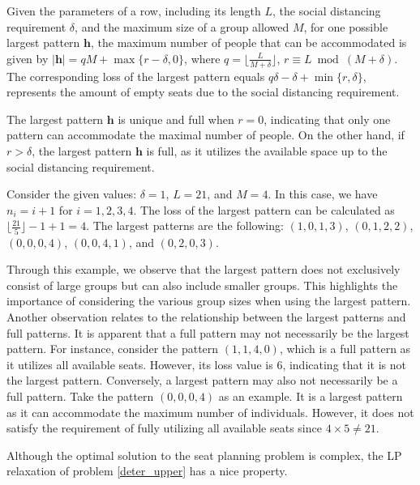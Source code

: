 \begin{prop}\label{lem_pattern}
Given the parameters of a row, including its length $L$, the social distancing requirement $\delta$, and the maximum size of a group allowed $M$, for one possible largest pattern $\bm{h}$, the maximum number of people that can be accommodated is given by $|\bm{h}| = qM + \max\{r-\delta, 0\}$, where $q = \lfloor \frac{L}{M + \delta} \rfloor$, $r \equiv L \bmod (M + \delta)$. The corresponding loss of the largest pattern equals $q \delta - \delta + \min\{r, \delta\}$, represents the amount of empty seats due to the social distancing requirement. 
\end{prop}

The largest pattern $\bm{h}$ is unique and full when $r = 0$, indicating that only one pattern can accommodate the maximal number of people. On the other hand, if $r > \delta$, the largest pattern $\bm{h}$ is full, as it utilizes the available space up to the social distancing requirement.


\begin{example}
Consider the given values: $\delta = 1$, $L = 21$, and $M = 4$. In this case, we have $n_i = i + 1$ for $i = 1, 2, 3, 4$. The loss of the largest pattern can be calculated as $\lfloor \frac{21}{5} \rfloor - 1 + 1 = 4$. The largest patterns are the following: $(1, 0, 1, 3)$, $(0, 1, 2, 2)$, $(0, 0, 0, 4)$, $(0, 0, 4, 1)$, and $(0, 2, 0, 3)$. 
\end{example}
  

Through this example, we observe that the largest pattern does not exclusively consist of large groups but can also include smaller groups. This highlights the importance of considering the various group sizes when using the largest pattern. Another observation relates to the relationship between the largest patterns and full patterns. It is apparent that a full pattern may not necessarily be the largest pattern. For instance, consider the pattern $(1, 1, 4, 0)$, which is a full pattern as it utilizes all available seats. However, its loss value is 6, indicating that it is not the largest pattern. Conversely, a largest pattern may also not necessarily be a full pattern. Take the pattern $(0, 0, 0, 4)$ as an example. It is a largest pattern as it can accommodate the maximum number of individuals. However, it does not satisfy the requirement of fully utilizing all available seats since $4 \times 5 \neq 21$.


Although the optimal solution to the seat planning problem is complex, the LP relaxation of problem \eqref{deter_upper} has a nice property.

